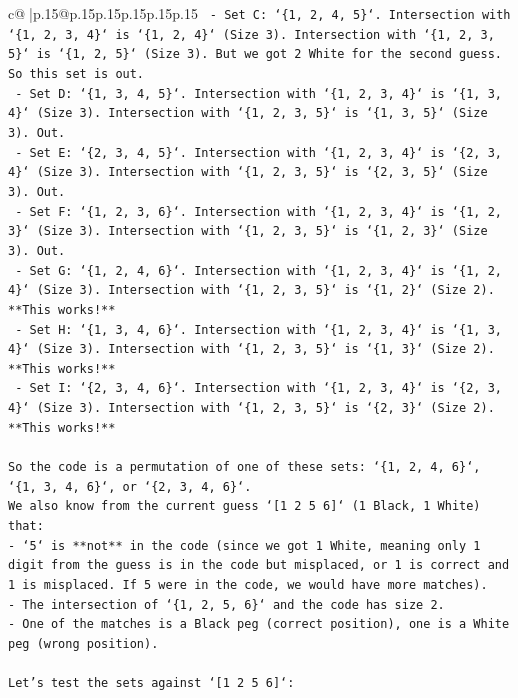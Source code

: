 \documentclass{article}
\begin{document}
{\begin{supertabular}{c@{$\;$}|p{.15\linewidth}@{}p{.15\linewidth}p{.15\linewidth}p{.15\linewidth}p{.15\linewidth}p{.15\linewidth}}
{{{\texttt{        {-}   Set C: `\{1, 2, 4, 5\}`. Intersection with `\{1, 2, 3, 4\}` is `\{1, 2, 4\}` (Size 3). Intersection with `\{1, 2, 3, 5\}` is `\{1, 2, 5\}` (Size 3). But we got 2 White for the second guess. So this set is out.} \\
\texttt{        {-}   Set D: `\{1, 3, 4, 5\}`. Intersection with `\{1, 2, 3, 4\}` is `\{1, 3, 4\}` (Size 3). Intersection with `\{1, 2, 3, 5\}` is `\{1, 3, 5\}` (Size 3). Out.} \\
\texttt{        {-}   Set E: `\{2, 3, 4, 5\}`. Intersection with `\{1, 2, 3, 4\}` is `\{2, 3, 4\}` (Size 3). Intersection with `\{1, 2, 3, 5\}` is `\{2, 3, 5\}` (Size 3). Out.} \\
\texttt{        {-}   Set F: `\{1, 2, 3, 6\}`. Intersection with `\{1, 2, 3, 4\}` is `\{1, 2, 3\}` (Size 3). Intersection with `\{1, 2, 3, 5\}` is `\{1, 2, 3\}` (Size 3). Out.} \\
\texttt{        {-}   Set G: `\{1, 2, 4, 6\}`. Intersection with `\{1, 2, 3, 4\}` is `\{1, 2, 4\}` (Size 3). Intersection with `\{1, 2, 3, 5\}` is `\{1, 2\}` (Size 2). **This works!**} \\
\texttt{        {-}   Set H: `\{1, 3, 4, 6\}`. Intersection with `\{1, 2, 3, 4\}` is `\{1, 3, 4\}` (Size 3). Intersection with `\{1, 2, 3, 5\}` is `\{1, 3\}` (Size 2). **This works!**} \\
\texttt{        {-}   Set I: `\{2, 3, 4, 6\}`. Intersection with `\{1, 2, 3, 4\}` is `\{2, 3, 4\}` (Size 3). Intersection with `\{1, 2, 3, 5\}` is `\{2, 3\}` (Size 2). **This works!**} \\
\\ 
\texttt{So the code is a permutation of one of these sets: `\{1, 2, 4, 6\}`, `\{1, 3, 4, 6\}`, or `\{2, 3, 4, 6\}`.} \\
\texttt{We also know from the current guess `{[}1 2 5 6{]}` (1 Black, 1 White) that:} \\
\texttt{{-}   `5` is **not** in the code (since we got 1 White, meaning only 1 digit from the guess is in the code but misplaced, or 1 is correct and 1 is misplaced. If 5 were in the code, we would have more matches).} \\
\texttt{{-}   The intersection of `\{1, 2, 5, 6\}` and the code has size 2.} \\
\texttt{{-}   One of the matches is a Black peg (correct position), one is a White peg (wrong position).} \\
\\ 
\texttt{Let's test the sets against `{[}1 2 5 6{]}`:} \\
}}}
\end{supertabular}}
\end{document}
